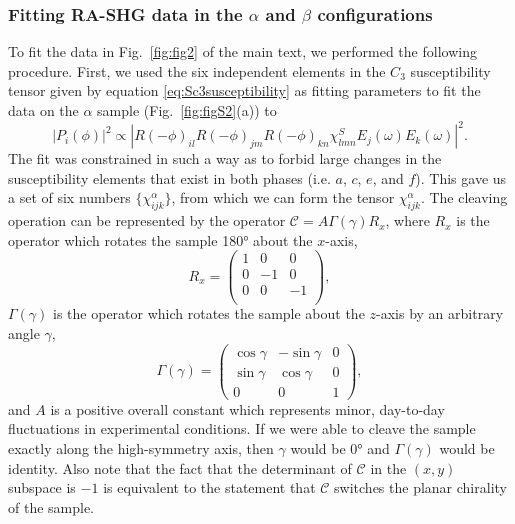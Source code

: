 \subsubsection{Fitting RA-SHG data in the $\alpha$ and $\beta$ configurations}
\label{sec:mirrorflip}
To fit the data in Fig.~\ref{fig:fig2} of the main text, we performed the following procedure.
First, we used the six independent elements in the $C_{3}$ susceptibility tensor given by equation \ref{eq:Sc3susceptibility} as fitting parameters to fit the data on the $\alpha$ sample (Fig.~\ref{fig:figS2}(a)) to 
\begin{equation}
|P_i(\phi)|^2 \propto |R(-\phi)_{il}R(-\phi)_{jm}R(-\phi)_{kn}\chi_{lmn}^SE_j(\omega)E_k(\omega)|^2.
\end{equation}
The fit was constrained in such a way as to forbid large changes in the susceptibility elements that exist in both phases (i.e. $a$, $c$, $e$, and $f$).
This gave us a set of six numbers $\{\chi_{ijk}^\alpha\}$, from which we can form the tensor $\chi_{ijk}^\alpha$.
The cleaving operation can be represented by the operator $\mathcal{C} = A\Gamma(\gamma)R_x$, where $R_x$ is the operator which rotates the sample \ang{180} about the $x$-axis,
\begin{equation}
\label{eq:chiralityswitcher}
R_x = \begin{pmatrix}
1 & 0 & 0 \\
0 & -1 & 0 \\
0 & 0 & -1 \\
\end{pmatrix},
\end{equation}
$\Gamma(\gamma)$ is the operator which rotates the sample about the $z$-axis by an arbitrary angle $\gamma$,
\begin{equation}
\Gamma(\gamma) = \begin{pmatrix}
\cos{\gamma} & -\sin{\gamma} & 0 \\
\sin{\gamma} & \cos{\gamma} & 0 \\
0 & 0 & 1
\end{pmatrix},
\end{equation}
and $A$ is a positive overall constant which represents minor, day-to-day fluctuations in experimental conditions.
If we were able to cleave the sample exactly along the high-symmetry axis, then $\gamma$ would be \ang{0} and $\Gamma(\gamma)$ would be identity.
Also note that the fact that the determinant of $\mathcal{C}$ in the $(x, y)$ subspace is $-1$ is equivalent to the statement that $\mathcal{C}$ switches the planar chirality of the sample.

